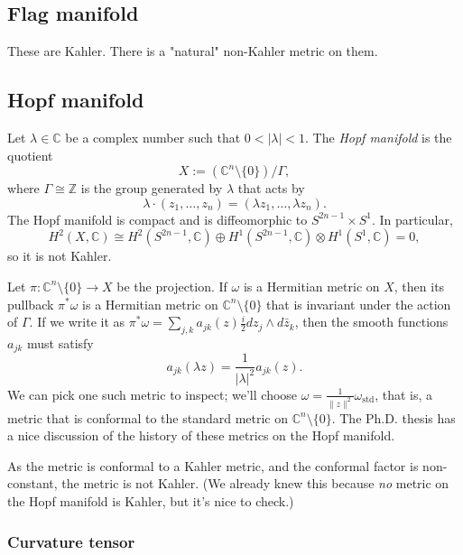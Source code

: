 \documentclass[11pt]{article}
\newcommand{\kk}[1]{\mathbb{#1}}
\begin{document}
\subsection{Flag manifold}
\label{sec:orga0ef6a0}

These are Kahler. There is a "natural" non-Kahler metric on them.

\subsection{Hopf manifold}
\label{sec:org8f5818e}

Let \(\lambda \in \kk C\) be a complex number such that \(0 < |\lambda| < 1\). The \emph{Hopf manifold} is the quotient
$$
X := (\kk C^n \setminus \{0\}) / \Gamma,
$$
where \(\Gamma \cong \kk Z\) is the group generated by \(\lambda\) that acts by
$$
\lambda \cdot (z_1, \ldots, z_n) = (\lambda z_1, \ldots, \lambda z_n).
$$
The Hopf manifold is compact and is diffeomorphic to \(S^{2n-1} \times S^1\). In particular,
$$
H^2(X, \kk C) \cong H^2(S^{2n-1}, \kk C) \oplus H^1(S^{2n-1}, \kk C) \otimes H^1(S^1, \kk C) = 0,
$$
so it is not Kahler.

Let \(\pi : \kk C^n \setminus \{0\} \to X\) be the projection. If \(\omega\) is a Hermitian metric on \(X\), then its pullback \(\pi^*\omega\) is a Hermitian metric on \(\kk C^n \setminus \{0\}\) that is invariant under the action of \(\Gamma\). If we write it as \(\pi^*\omega = \sum_{j,k} a_{jk}(z) \tfrac{i}{2} dz_j \wedge d\bar z_k\), then the smooth functions \(a_{jk}\) must satisfy
$$
a_{jk}(\lambda z) = \frac{1}{|\lambda|^2} a_{jk}(z).
$$
We can pick one such metric to inspect; we'll choose \(\omega = \frac{1}{\|z\|^2} \omega_{\mathrm{std}}\), that is, a metric that is conformal to the standard metric on \(\kk C^n \setminus \{0\}\). The Ph.D. thesis \cite{istrati:tel-02156198} has a nice discussion of the history of these metrics on the Hopf manifold.

As the metric is conformal to a Kahler metric, and the conformal factor is non-constant, the metric is not Kahler. (We already knew this because \emph{no} metric on the Hopf manifold is Kahler, but it's nice to check.)


\subsubsection{Curvature tensor}
\label{sec:org96d544d}
\end{document}
